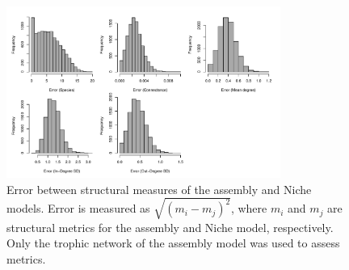 \documentclass[onecolumn,preprintnumbers,amsmath,amssymb,superscriptaddress]{revtex4-1}
\newcommand{\rr}[1]{{\rm #1}}
\begin{document}
\begin{bibunit}
\begin{figure}[h!]
\centering
\includegraphics[width=0.8\textwidth]{fig_error2.pdf}
\caption{
Error between structural measures of the assembly and Niche models.
Error is measured as $\sqrt{(m_i - m_j)^2}$, where $m_i$ and $m_j$ are structural metrics for the assembly and Niche model, respectively.
Only the trophic network of the assembly model was used to assess metrics.
}
\label{fig:error2}
\end{figure}



% 





\end{bibunit}
\end{document}
